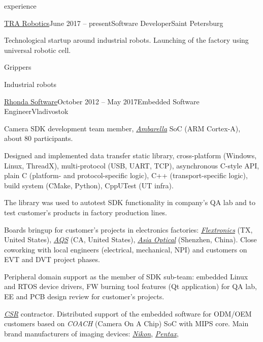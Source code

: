 \documentclass{template}
\begin{document}
\begin{rSection}{experience}
\begin{rCompany}{\href{http://www.tra.ai}{TRA Robotics}}{June 2017 -- present}{Software Developer}{Saint Petersburg}

\item Technological startup around industrial robots. Launching of the factory using universal
      robotic cell.
\item Grippers
\item Industrial robots

\end{rCompany}
\begin{rCompany}{\href{http://www.rhondasoftware.com}{Rhonda Software}}{October 2012 -- May 2017}{Embedded Software Engineer}{Vladivostok}

\item Camera SDK development team member, \href{http://www.ambarella.com}{\textit{Ambarella}} SoC (ARM Cortex-A), about 80 participants.
\item Designed and implemented data transfer static library, cross-platform (Windows, Linux, ThreadX), multi-protocol (USB, UART, TCP),
      asynchronous C-style API, plain C (platform- and protocol-specific logic), C++ (transport-specific logic), build system (CMake,
      Python), CppUTest (UT infra).
\item The library was used to autotest SDK functionality in company's QA lab and to test customer's products in factory production lines.
\item Boards bringup for customer's projects in electronics factories: \href{http://www.flextronics.com}{\textit{Flextronics}} (TX, United
      States), \href{http://aqs-inc.com}{\textit{AQS}} (CA, United States), \href{http://www.asia-optical.com/}{\textit{Asia Optical}}
      (Shenzhen, China). Close coworking with local engineers (electrical, mechanical, NPI) and customers on EVT and DVT
      project phases.
\item Peripheral domain support as the member of SDK sub-team: embedded Linux and RTOS device drivers, FW burning tool features (Qt application)
      for QA lab, EE and PCB design review for customer's projects.
\item \href{http://www.csr.com}{\textit{CSR}} contractor. Distributed support of the embedded software for ODM/OEM customers based on \textit{COACH}
      (Camera On A Chip) SoC with MIPS core.
      Main brand manufacturers of imaging devices: \href{http://www.nikon.com}{\textit{Nikon}}, \href{http://www.pentax.com}{\textit{Pentax}},

\end{rCompany}
\end{rSection}
\end{document}
